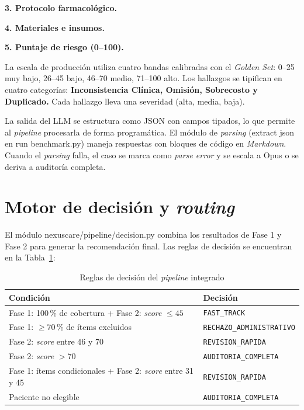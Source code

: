 \noindent \textbf{3. Protocolo farmacológico.}

\noindent \textbf{4. Materiales e insumos.}

\noindent \textbf{5. Puntaje de riesgo (0–100).}

La escala de producción utiliza cuatro bandas calibradas con el \textit{Golden Set}: 0–25 muy bajo, 26–45 bajo, 46–70 medio, 71–100 alto. Los hallazgos se tipifican en cuatro categorías: \textbf{Inconsistencia Clínica, Omisión, Sobrecosto y Duplicado.} Cada hallazgo lleva una severidad (alta, media, baja).

La salida del LLM se estructura como JSON con campos tipados, lo que permite al \textit{pipeline} procesarla de forma programática. El módulo de \textit{parsing} (extract json en run benchmark.py) maneja respuestas con bloques de código en \textit{Markdown}. Cuando el \textit{parsing} falla, el caso se marca como \textit{parse error} y se escala a Opus o se deriva a auditoría completa.

\section{Motor de decisión y \textit{routing}}

El módulo nexuscare/pipeline/decision.py combina los resultados de Fase 1 y Fase 2 para generar la recomendación final. Las reglas de decisión se encuentran en la Tabla~\ref{tab:reglas-decision-pipeline}:

\begin{table}[H]
    \centering
    \caption{Reglas de decisión del \textit{pipeline} integrado}
    \label{tab:reglas-decision-pipeline}

    \footnotesize
    \setlength{\tabcolsep}{8pt}
    \renewcommand{\arraystretch}{1.2}

    \begin{tabular}{
        p{}
        p{}
    }
        \toprule
        \textbf{Condición}
        & \textbf{Decisión} \\
        \midrule

        Fase 1: 100\,\% de cobertura + Fase 2:
        \textit{score} $\leq 45$
        & \texttt{FAST\_TRACK} \\

        Fase 1: $\geq 70$\,\% de ítems excluidos
        & \texttt{RECHAZO\_ADMINISTRATIVO} \\

        Fase 2: \textit{score} entre 46 y 70
        & \texttt{REVISION\_RAPIDA} \\

        Fase 2: \textit{score} $> 70$
        & \texttt{AUDITORIA\_COMPLETA} \\

        Fase 1: ítems condicionales + Fase 2:
        \textit{score} entre 31 y 45
        & \texttt{REVISION\_RAPIDA} \\

        Paciente no elegible
        & \texttt{AUDITORIA\_COMPLETA} \\

        \bottomrule
    \end{tabular}
\end{table}

